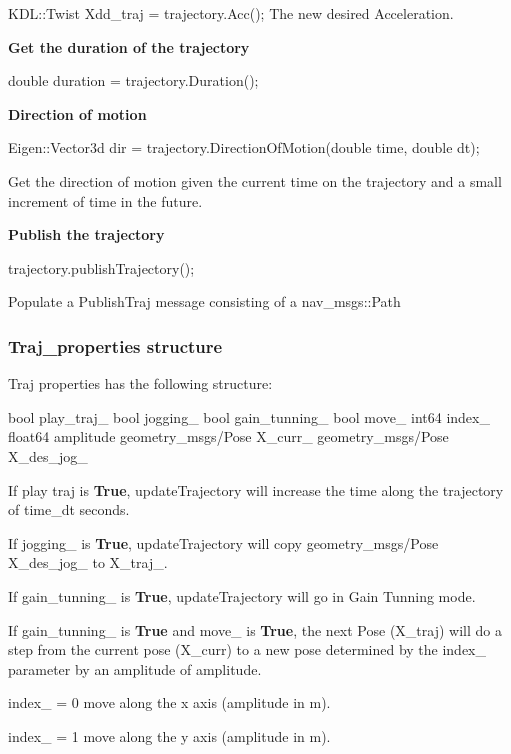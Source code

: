 {\ttfamily K\+D\+L\+::\+Twist Xdd\+\_\+traj = trajectory.\+Acc();} The new desired Acceleration.

{\bfseries Get the duration of the trajectory}

{\ttfamily double duration = trajectory.\+Duration();}

{\bfseries Direction of motion}

{\ttfamily Eigen\+::\+Vector3d dir = trajectory.\+Direction\+Of\+Motion(double time, double dt);}

Get the direction of motion given the current time on the trajectory and a small increment of time in the future.

{\bfseries Publish the trajectory}

{\ttfamily trajectory.\+publish\+Trajectory();}

Populate a Publish\+Traj message consisting of a nav\+\_\+msgs\+::\+Path

\subsubsection*{Traj\+\_\+properties structure}

Traj properties has the following structure\+: 
\begin{DoxyCode}
bool play\_traj\_
bool jogging\_
bool gain\_tunning\_
bool move\_
int64 index\_
float64 amplitude
geometry\_msgs/Pose X\_curr\_
geometry\_msgs/Pose X\_des\_jog\_
\end{DoxyCode}


If {\ttfamily play traj} is {\bfseries True}, update\+Trajectory will increase the time along the trajectory of time\+\_\+dt seconds.

If {\ttfamily jogging\+\_\+} is {\bfseries True}, update\+Trajectory will copy geometry\+\_\+msgs/\+Pose X\+\_\+des\+\_\+jog\+\_\+ to X\+\_\+traj\+\_\+.

If {\ttfamily gain\+\_\+tunning\+\_\+} is {\bfseries True}, update\+Trajectory will go in Gain Tunning mode.

If {\ttfamily gain\+\_\+tunning\+\_\+} is {\bfseries True} and {\ttfamily move\+\_\+} is {\bfseries True}, the next Pose (X\+\_\+traj) will do a step from the current pose (X\+\_\+curr) to a new pose determined by the {\ttfamily index\+\_\+} parameter by an amplitude of {\ttfamily amplitude}.

{\ttfamily index\+\_\+} = 0 move along the x axis ({\ttfamily amplitude} in m).

{\ttfamily index\+\_\+} = 1 move along the y axis ({\ttfamily amplitude} in m).


